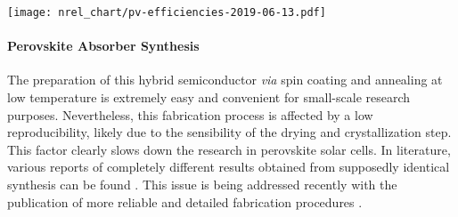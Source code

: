 	\begin{SCfigure}
		\centering
		\texttt{[image: nrel\_chart/pv-efficiencies-2019-06-13.pdf]}
		\label{fig:nrel_chart}
	\end{SCfigure}



	\paragraph{Perovskite Absorber Synthesis}
	The preparation of this hybrid semiconductor \textsl{via} spin coating and annealing at low temperature is extremely easy and convenient for small-scale research purposes.
	Nevertheless, this fabrication process is affected by a low reproducibility, likely due to the sensibility of the drying and crystallization step.
	This factor clearly slows down the research in perovskite solar cells.
	In literature, various reports of completely different results obtained from supposedly identical synthesis can be found \cite{Pockett2015,Gottesman2014}.
	This issue is being addressed recently with the publication of more reliable and detailed fabrication procedures \cite{Saliba2018}.

